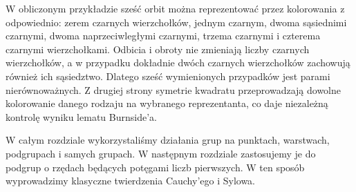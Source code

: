 \begin{uwaga}
W obliczonym przykładzie sześć orbit można reprezentować przez
kolorowania z odpowiednio: zerem czarnych wierzchołków,
jednym czarnym, dwoma sąsiednimi czarnymi,
dwoma naprzeciwległymi czarnymi, trzema czarnymi i czterema
czarnymi wierzchołkami. Odbicia i obroty nie zmieniają
liczby czarnych wierzchołków, a w przypadku dokładnie dwóch
czarnych wierzchołków zachowują również ich sąsiedztwo.
Dlatego sześć wymienionych przypadków jest parami nierównoważnych.
Z drugiej strony symetrie kwadratu przeprowadzają dowolne
kolorowanie danego rodzaju na wybranego reprezentanta,
co daje niezależną kontrolę wyniku lematu Burnside'a.
\end{uwaga}

\begin{uwaga}
W całym rozdziale wykorzystaliśmy działania grup na punktach,
warstwach, podgrupach i samych grupach.
W następnym rozdziale zastosujemy je do podgrup o rzędach
będących potęgami liczb pierwszych. W ten sposób wyprowadzimy
klasyczne twierdzenia Cauchy'ego i Sylowa.
\end{uwaga}
